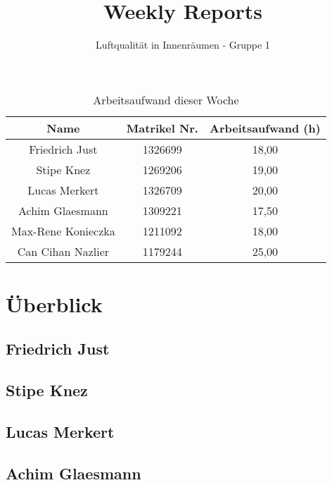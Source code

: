 \documentclass[]{article}
\title{Weekly Reports}
\author{Luftqualität in Innenräumen - Gruppe 1}
\begin{document}
\maketitle

\begin{table}[h!]
	\centering
	\begin{tabular}{|c|c|c|}
		\hline
		{\textbf{Name}}				&		{\textbf{Matrikel Nr.}} & {\textbf{Arbeitsaufwand (h)}} \\
		\hline
		Friedrich Just				&		1326699 				&		18,00\\
		\hline
		Stipe Knez					&		1269206 				&	19,00	\\
		\hline
		Lucas Merkert				&		1326709					&	20,00	\\
		\hline
		Achim Glaesmann				&		1309221					&	17,50	\\
		\hline
		Max-Rene Konieczka			&		1211092					&	18,00	\\
		\hline
		Can Cihan Nazlier			&		1179244					&	25,00	\\
		\hline
	\end{tabular}
	\caption{Arbeitsaufwand dieser Woche}
	\label{tab:worakload}
\end{table}



\section{Überblick}


\subsection{Friedrich Just}







\subsection{Stipe Knez}

\subsection{Lucas Merkert}



\subsection{Achim Glaesmann}
\end{document}
